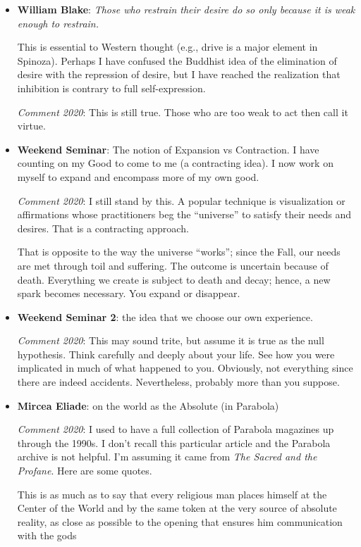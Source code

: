 \begin{itemize}
\item \textbf{William Blake}: \emph{Those who restrain their desire do so only because it is weak enough to restrain.}

This is essential to Western thought (e.g., drive is a major element in Spinoza). Perhaps I have confused the Buddhist idea of the elimination of desire with the repression of desire, but I have reached the realization that inhibition is contrary to full self-expression.

\emph{Comment 2020}: This is still true. Those who are too weak to act then call it virtue.

\item \textbf{Weekend Seminar}: The notion of Expansion vs Contraction. I have counting on my Good to come to me (a contracting idea). I now work on myself to expand and encompass more of my own good.

\emph{Comment 2020}: I still stand by this. A popular technique is visualization or affirmations whose practitioners beg the ``universe'' to satisfy their needs and desires. That is a contracting approach.

That is opposite to the way the universe ``works''; since the Fall, our needs are met through toil and suffering. The outcome is uncertain because of death. Everything we create is subject to death and decay; hence, a new spark becomes necessary. You expand or disappear.

\item \textbf{Weekend Seminar 2}: the idea that we choose our own experience.

\emph{Comment 2020}: This may sound trite, but assume it is true as the null hypothesis. Think carefully and deeply about your life. See how you were implicated in much of what happened to you. Obviously, not everything since there are indeed accidents. Nevertheless, probably more than you suppose.

\item \textbf{Mircea Eliade}: on the world as the Absolute (in Parabola)

\emph{Comment 2020}: I used to have a full collection of Parabola magazines up through the 1990s. I don't recall this particular article and the Parabola archive is not helpful. I'm assuming it came from \emph{The Sacred and the Profane}. Here are some quotes.

This is as much as to say that every religious man places himself at the Center of the World and by the same token at the very source of absolute reality, as close as possible to the opening that ensures him communication with the gods


\end{itemize}
